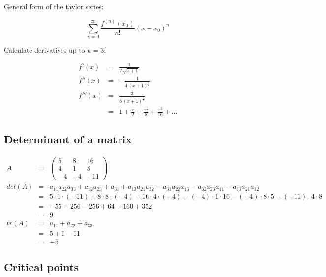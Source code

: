 \documentclass[11pt,a4paper]{article}
\begin{document}
General form of the taylor series:

\begin{displaymath}
\sum_{n=0}^\infty \frac{f^{(n)}(x_0)}{n!} (x - x_0)^n
\end{displaymath}

Calculate derivatives up to $n=3$:

\begin{eqnarray*}
f'(x)   &   = & \frac{1}{2 \, \sqrt{x + 1}}\\
f''(x)  &   = & - \frac{1}{4 \, (x + 1)^\frac{3}{2}}\\
f'''(x) &   = & \frac{3}{8 \, (x + 1)^\frac{5}{2}}\\
        &   = & 1 + \frac{x}{2} + \frac{x^2}{8} + \frac{x^3}{16} + \ldots
\end{eqnarray*}

\subsection{Determinant of a matrix}

\begin{eqnarray*}
A   &   = & \begin{pmatrix}
  5 &   8 &  16\\
  4 &   1 &   8\\
 -4 &  -4 & -11
\end{pmatrix}\\
det(A)  &   = & a_{11} a_{22} a_{33} + a_{12} a_{23} + a_{31} + a_{13} a_{21} a_{32}
            - a_{31} a_{22} a_{13} - a_{32} a_{23} a_{11} - a_{33} a_{21} a_{12}\\
        &   = & 5 \cdot 1 \cdot (-11) + 8 \cdot 8 \cdot (-4) + 16 \cdot 4 \cdot (-4)
            - (-4) \cdot 1 \cdot 16 - (-4) \cdot 8 \cdot 5 - (-11) \cdot 4 \cdot 8\\
        &   = & -55 - 256 - 256 + 64 + 160 + 352\\
        &   = & 9\\
tr(A)   &   = & a_{11} + a_{22} + a_{33}\\
        &   = & 5 + 1 - 11\\
        &   = & -5
\end{eqnarray*}

\subsection{Critical points}
\end{document}
